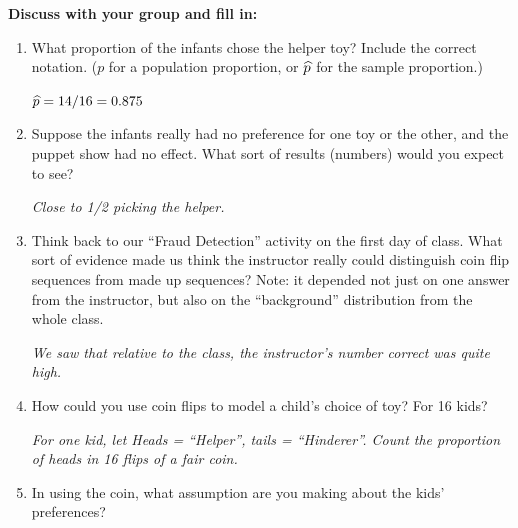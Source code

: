 {\bf Discuss with your group and fill in:	}\vspace{-.3cm}
\begin{enumerate}
  \item  What proportion of the infants chose the helper toy? Include
    the correct notation. ($p$ for a population proportion, or
    $\widehat{p}$ for the sample proportion.)
\begin{students}
     \vspace{1cm}
\end{students}

\begin{key}
     {\it  $\widehat{p} = 14/16 = 0.875$ }
\end{key}
\item  
     Suppose the infants really had no preference for one toy or the other,
     and the puppet show had no effect.  What sort of results
     (numbers) would     you expect to see?
\begin{students}
       \vspace{1cm}
\end{students}

\begin{key}
       {\it  Close to 1/2 picking the helper.}
\end{key}

   \item Think back to our ``Fraud Detection'' activity on the first day of
     class.  What sort of evidence made us think the instructor really
     could distinguish coin flip sequences from made up sequences?  Note:
     it depended not just on one answer from the instructor, but also
     on the ``background'' distribution from the whole class.
\begin{students}
  \vspace{2cm}
\end{students}

\begin{key}
       {\it   We saw that relative to the class, the instructor's number
         correct was quite high.}
\end{key}
 
   \item How could you use coin flips to model a child's choice of
     toy? For 16 kids?
\begin{students}
  \vspace{2cm}
\end{students}

\begin{key}
       {\it  For one kid, let Heads = ``Helper'', tails =
         ``Hinderer''.  Count the proportion of heads in 16 flips of a
         fair coin.} 
\end{key}
   \item In using the coin, what assumption are you making about the
     kids' preferences? 
\begin{students}
  \vspace*{2cm}
\end{students}


\end{enumerate}
